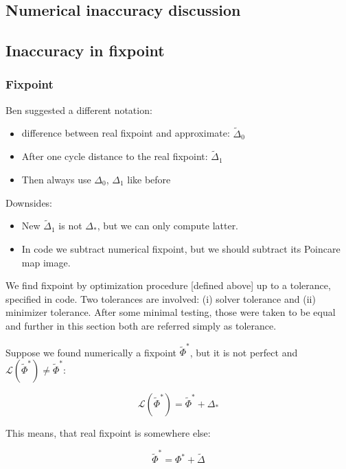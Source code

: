 \documentclass[a4paper,10pt]{article}
\newcommand*{\wt}{\widetilde} %
\newcommand*{\FP}{\Phi^*}%
\newcommand*{\D}{\Delta}%
\begin{document}
\begin{appendices}
\section{Numerical inaccuracy discussion}


\subsection{Inaccuracy in fixpoint}

\subsubsection{Fixpoint}


\begin{itshape}
{\small 
Ben suggested a different notation:
\begin{itemize}
\item  difference between real fixpoint and approximate: $\wt \D_0$
\item  After one cycle distance to the real fixpoint: $\wt \D_1$
\item Then always use $\D_0$, $\D_1$ like before

\end{itemize}
Downsides:

\begin{itemize}
\item New $\wt \D_1$ is not $\D_*$, but we can only compute latter.
\item In code we subtract numerical fixpoint, but we should  subtract its Poincare map image.
\end{itemize}

}
\end{itshape}

We find fixpoint by optimization procedure [defined above] up to a tolerance, specified in code. Two tolerances are involved: (i) solver tolerance and (ii) minimizer tolerance. After some minimal testing, those were taken to be equal and further in this section both are referred simply as tolerance.

Suppose we found numerically a fixpoint $\wt \Phi^*$, but it is not perfect and $ \mathcal{L}(\wt \FP) \neq \wt \FP $:

$$ \mathcal{L}(\wt \FP) = \wt \FP + \D_*$$

This means, that real fixpoint is somewhere else:

$$\wt \FP= \FP + \wt{\D}$$


\end{appendices}
\end{document}
